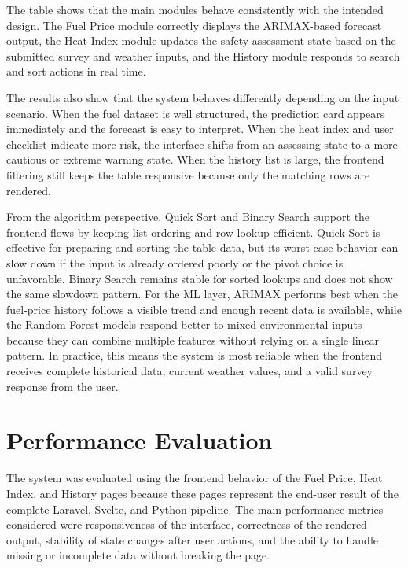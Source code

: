 \documentclass[12pt]{article}
\begin{document}
The table shows that the main modules behave consistently with the intended design. The Fuel Price module correctly displays the ARIMAX-based forecast output, the Heat Index module updates the safety assessment state based on the submitted survey and weather inputs, and the History module responds to search and sort actions in real time.
 
The results also show that the system behaves differently depending on the input scenario. When the fuel dataset is well structured, the prediction card appears immediately and the forecast is easy to interpret. When the heat index and user checklist indicate more risk, the interface shifts from an assessing state to a more cautious or extreme warning state. When the history list is large, the frontend filtering still keeps the table responsive because only the matching rows are rendered.
 
From the algorithm perspective, Quick Sort and Binary Search support the frontend flows by keeping list ordering and row lookup efficient. Quick Sort is effective for preparing and sorting the table data, but its worst-case behavior can slow down if the input is already ordered poorly or the pivot choice is unfavorable. Binary Search remains stable for sorted lookups and does not show the same slowdown pattern. For the ML layer, ARIMAX performs best when the fuel-price history follows a visible trend and enough recent data is available, while the Random Forest models respond better to mixed environmental inputs because they can combine multiple features without relying on a single linear pattern. In practice, this means the system is most reliable when the frontend receives complete historical data, current weather values, and a valid survey response from the user.

\section{Performance Evaluation}

The system was evaluated using the frontend behavior of the Fuel Price, Heat Index, and History pages because these pages represent the end-user result of the complete Laravel, Svelte, and Python pipeline. The main performance metrics considered were responsiveness of the interface, correctness of the rendered output, stability of state changes after user actions, and the ability to handle missing or incomplete data without breaking the page.
\end{document}

